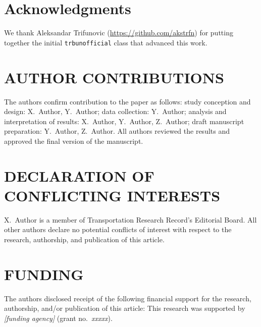 \documentclass[numbered]{trbunofficial2}
\begin{document}
\section{Acknowledgments}
We thank Aleksandar Trifunovic (\url{https://github.com/akstrfn}) for putting together the initial \verb|trbunofficial| class that advanced this work.

\section*{AUTHOR CONTRIBUTIONS}
The authors confirm contribution to the paper as follows: 
study conception and design: X.~Author, Y.~Author; 
data collection: Y.~Author; 
analysis and interpretation of results: X.~Author, Y.~Author, Z.~Author; 
draft manuscript preparation: Y.~Author, Z.~Author. 
All authors reviewed the results and approved the final version of the manuscript.

\section*{DECLARATION OF CONFLICTING INTERESTS}
X.~Author is a member of Transportation Research Record’s Editorial Board.  All other authors declare no potential conflicts of interest with respect to the research, authorship, and publication of this article.



\section*{FUNDING}
The authors disclosed receipt of the following financial support 
for the research, authorship, and/or publication of this article: 
This research was supported by \emph{[funding agency]} (grant no.~\emph{xxxxx}).



\newpage


\end{document}
